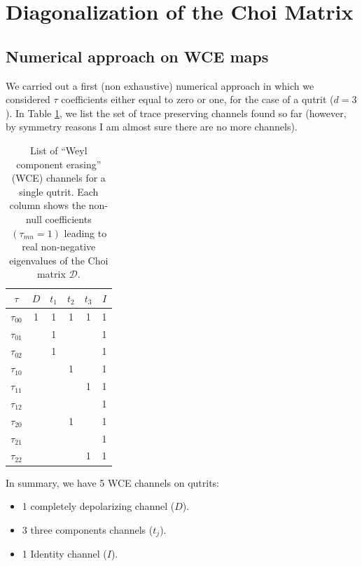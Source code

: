 \section{Diagonalization of the Choi Matrix} %
% 
\subsection{Numerical approach on WCE maps} %
% 
We carried out a first (non exhaustive) numerical approach in which we considered $\tau$ coefficients either equal to zero or one, for the case of a qutrit ($d=3$). In Table \ref{Table1}, we list the set of trace preserving channels found so far (however, by symmetry reasons I am almost sure there are no more channels).
% 
\begin{table}[h]
 \centering
\begin{tabular}{ |c|c|c|c|c|c| } 
\hline
$\tau$ & $D$ & $t_1$ &$t_2$ &$t_3$ & $I$\\
\hline
$\tau_{00}$ & 1 & 1 & 1 & 1& 1\\ 
\hline
$\tau_{01}$ &  & 1 & && 1\\ 
\hline
$\tau_{02}$ & & 1 & && 1\\ 
\hline
$\tau_{10}$ & &  & 1 & & 1\\ 
\hline
$\tau_{11}$ &  &  & & 1& 1\\ 
\hline
$\tau_{12}$ &  &  & && 1\\ 
\hline
$\tau_{20}$ &  &  & 1&& 1\\ 
\hline
$\tau_{21}$ &  &  & && 1\\ 
\hline
$\tau_{22}$ &  &  & & 1& 1\\ 
\hline
\end{tabular}
\caption{List of ``Weyl component erasing'' (WCE) channels for a single qutrit. Each column shows the non-null coefficients $(\tau_{mn}=1)$ leading to real non-negative eigenvalues of the Choi matrix $\mathcal{D}$.}
\label{Table1}
\end{table}
% 

In summary, we have 5 WCE channels on qutrits:
\begin{itemize}
 \item 1 completely depolarizing channel ($D$).
 \item 3 three components channels ($t_j$).
 \item 1 Identity channel ($I$).
\end{itemize}
